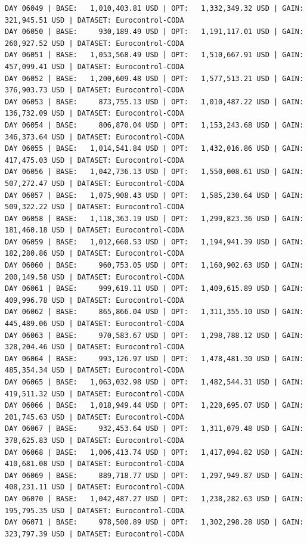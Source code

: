 \documentclass[11pt,a4paper]{article}
\begin{document}
\begin{verbatim}
DAY 06049 | BASE:   1,010,403.81 USD | OPT:   1,332,349.32 USD | GAIN: 321,945.51 USD | DATASET: Eurocontrol-CODA
DAY 06050 | BASE:     930,189.49 USD | OPT:   1,191,117.01 USD | GAIN: 260,927.52 USD | DATASET: Eurocontrol-CODA
DAY 06051 | BASE:   1,053,568.49 USD | OPT:   1,510,667.91 USD | GAIN: 457,099.41 USD | DATASET: Eurocontrol-CODA
DAY 06052 | BASE:   1,200,609.48 USD | OPT:   1,577,513.21 USD | GAIN: 376,903.73 USD | DATASET: Eurocontrol-CODA
DAY 06053 | BASE:     873,755.13 USD | OPT:   1,010,487.22 USD | GAIN: 136,732.09 USD | DATASET: Eurocontrol-CODA
DAY 06054 | BASE:     806,870.04 USD | OPT:   1,153,243.68 USD | GAIN: 346,373.64 USD | DATASET: Eurocontrol-CODA
DAY 06055 | BASE:   1,014,541.84 USD | OPT:   1,432,016.86 USD | GAIN: 417,475.03 USD | DATASET: Eurocontrol-CODA
DAY 06056 | BASE:   1,042,736.13 USD | OPT:   1,550,008.61 USD | GAIN: 507,272.47 USD | DATASET: Eurocontrol-CODA
DAY 06057 | BASE:   1,075,908.43 USD | OPT:   1,585,230.64 USD | GAIN: 509,322.22 USD | DATASET: Eurocontrol-CODA
DAY 06058 | BASE:   1,118,363.19 USD | OPT:   1,299,823.36 USD | GAIN: 181,460.18 USD | DATASET: Eurocontrol-CODA
DAY 06059 | BASE:   1,012,660.53 USD | OPT:   1,194,941.39 USD | GAIN: 182,280.86 USD | DATASET: Eurocontrol-CODA
DAY 06060 | BASE:     960,753.05 USD | OPT:   1,160,902.63 USD | GAIN: 200,149.58 USD | DATASET: Eurocontrol-CODA
DAY 06061 | BASE:     999,619.11 USD | OPT:   1,409,615.89 USD | GAIN: 409,996.78 USD | DATASET: Eurocontrol-CODA
DAY 06062 | BASE:     865,866.04 USD | OPT:   1,311,355.10 USD | GAIN: 445,489.06 USD | DATASET: Eurocontrol-CODA
DAY 06063 | BASE:     970,583.67 USD | OPT:   1,298,788.12 USD | GAIN: 328,204.46 USD | DATASET: Eurocontrol-CODA
DAY 06064 | BASE:     993,126.97 USD | OPT:   1,478,481.30 USD | GAIN: 485,354.34 USD | DATASET: Eurocontrol-CODA
DAY 06065 | BASE:   1,063,032.98 USD | OPT:   1,482,544.31 USD | GAIN: 419,511.32 USD | DATASET: Eurocontrol-CODA
DAY 06066 | BASE:   1,018,949.44 USD | OPT:   1,220,695.07 USD | GAIN: 201,745.63 USD | DATASET: Eurocontrol-CODA
DAY 06067 | BASE:     932,453.64 USD | OPT:   1,311,079.48 USD | GAIN: 378,625.83 USD | DATASET: Eurocontrol-CODA
DAY 06068 | BASE:   1,006,413.74 USD | OPT:   1,417,094.82 USD | GAIN: 410,681.08 USD | DATASET: Eurocontrol-CODA
DAY 06069 | BASE:     889,718.77 USD | OPT:   1,297,949.87 USD | GAIN: 408,231.11 USD | DATASET: Eurocontrol-CODA
DAY 06070 | BASE:   1,042,487.27 USD | OPT:   1,238,282.63 USD | GAIN: 195,795.35 USD | DATASET: Eurocontrol-CODA
DAY 06071 | BASE:     978,500.89 USD | OPT:   1,302,298.28 USD | GAIN: 323,797.39 USD | DATASET: Eurocontrol-CODA

\end{verbatim}
\end{document}
